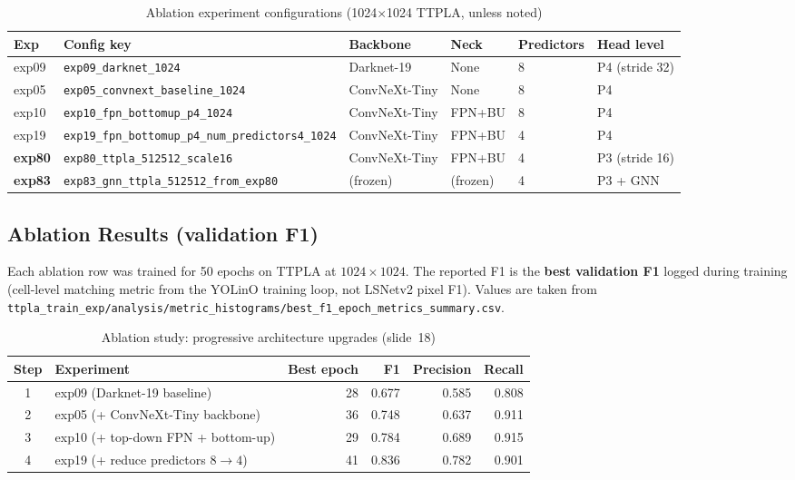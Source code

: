 \documentclass[11pt,a4paper]{article}
\begin{document}
\begin{table}[H]
\centering
\caption{Ablation experiment configurations (1024$\times$1024 TTPLA, unless noted)}
\begin{tabular}{llllll}
\toprule
Exp & Config key & Backbone & Neck & Predictors & Head level \\
\midrule
exp09 & \texttt{exp09\_darknet\_1024} & Darknet-19 & None & 8 & P4 (stride 32) \\
exp05 & \texttt{exp05\_convnext\_baseline\_1024} & ConvNeXt-Tiny & None & 8 & P4 \\
exp10 & \texttt{exp10\_fpn\_bottomup\_p4\_1024} & ConvNeXt-Tiny & FPN+BU & 8 & P4 \\
exp19 & \texttt{exp19\_fpn\_bottomup\_p4\_num\_predictors4\_1024} & ConvNeXt-Tiny & FPN+BU & 4 & P4 \\
\textbf{exp80} & \texttt{exp80\_ttpla\_512512\_scale16} & ConvNeXt-Tiny & FPN+BU & 4 & P3 (stride 16) \\
\textbf{exp83} & \texttt{exp83\_gnn\_ttpla\_512512\_from\_exp80} & (frozen) & (frozen) & 4 & P3 + GNN \\
\bottomrule
\end{tabular}
\end{table}

\subsection{Ablation Results (validation F1)}

Each ablation row was trained for 50 epochs on TTPLA at $1024 \times 1024$.
The reported F1 is the \textbf{best validation F1} logged during training
(cell-level matching metric from the YOLinO training loop, not LSNetv2 pixel F1).
Values are taken from
\texttt{ttpla\_train\_exp/analysis/metric\_histograms/best\_f1\_epoch\_metrics\_summary.csv}.

\begin{table}[H]
\centering
\caption{Ablation study: progressive architecture upgrades (slide~18)}
\begin{tabular}{clrrrr}
\toprule
Step & Experiment & Best epoch & F1 & Precision & Recall \\
\midrule
1 & exp09 (Darknet-19 baseline)           & 28 & 0.677 & 0.585 & 0.808 \\
2 & exp05 (+ ConvNeXt-Tiny backbone)        & 36 & 0.748 & 0.637 & 0.911 \\
3 & exp10 (+ top-down FPN + bottom-up)      & 29 & 0.784 & 0.689 & 0.915 \\
4 & exp19 (+ reduce predictors $8 \to 4$) & 41 & 0.836 & 0.782 & 0.901 \\
\bottomrule
\end{tabular}
\end{table}
\end{document}
